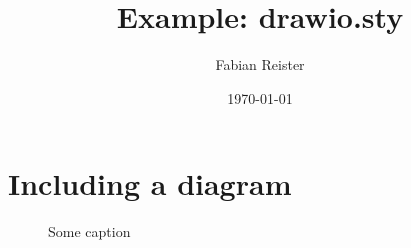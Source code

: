 \documentclass[11pt]{article}
\title{ Example: drawio.sty }
\author{ Fabian Reister }
\date{\today}
\begin{document}
\maketitle	
\pagebreak


\section{Including a diagram}

\begin{figure}[ht]
    \centering
    \caption{Some caption}
    \label{fig:mylabel}
\end{figure}
\end{document}
